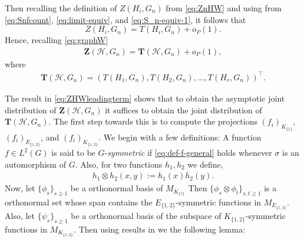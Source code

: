 \documentclass[11pt,reqno]{amsart}
\numberwithin{equation}{section}
\theoremstyle{definition}
\begin{document}
Then recalling the definition of $Z(H_i, G_n)$ from \eqref{eq:ZnHW} and using from \eqref{eq:Snfcount}, \eqref{eq:limit-equiv}, and \eqref{eq:S_n-equiv-1}, it follows that 
$$Z(H_i, G_n) = T(H_i, G_n) + o_P(1).$$ 
Hence, recalling \eqref{eq:graphW} 
\begin{align}\label{eq:ZHWleadingterm}
\bm Z(\mathcal H, G_n) = \bm T(\mathcal H, G_n) + o_P(1), 
\end{align}
where 
\begin{align}\label{eq:TnHW}
 \bm T(\mathcal H, G_n) = (T(H_1, G_n), T(H_2, G_n), \ldots, T(H_r, G_n))^\top. 
\end{align}  

The result in \eqref{eq:ZHWleadingterm} shows that to obtain the asymptotic joint distribution of $\bm Z(\mathcal H, G_n)$ it suffices to obtain the joint distribution of $ \bm T(\mathcal H, G_n)$. The first step towards this is to compute the projections $(f_i)_{K_{\{1\}}}$,  $(f_i)_{E_{\{1,2\}}}$, and $(f_i)_{K_{\{1,2\}}}$. We begin with a few definitions: 
A function $f\in L^{2}(G)$ is said to be $G$-{\it symmetric} if \eqref{eq:def-f-general} holds whenever $\sigma$ is an automorphism of $G$. 
Also, for two functions $h_{1}, h_{2}$ we define,
\begin{align*}
    h_{1} \otimes h_{2}(x,y) := h_{1}(x) h_{2}(y).
\end{align*}
Now, let $\{\phi_{s}\}_{s \geq 1}$ be a orthonormal basis of $M_{K_{\{1\}}}$
Then $\{\phi_{s}\otimes\phi_{t}\}_{s, t \geq 1}$ is a orthonormal set whose span contains the $E_{\{1,2\}}$-symmetric functions in $M_{E_{\{1,2\}}}$. Also, let $\{\psi_{s}\}_{s \geq 1}$ be a orthonormal basis of the subspace of $K_{\{1,2\}}$-symmetric functions in $M_{K_{\{1,2\}}}$. Then using results in \cite{BCJ,janson1991asymptotic} we the following lemma: 
\end{document}

